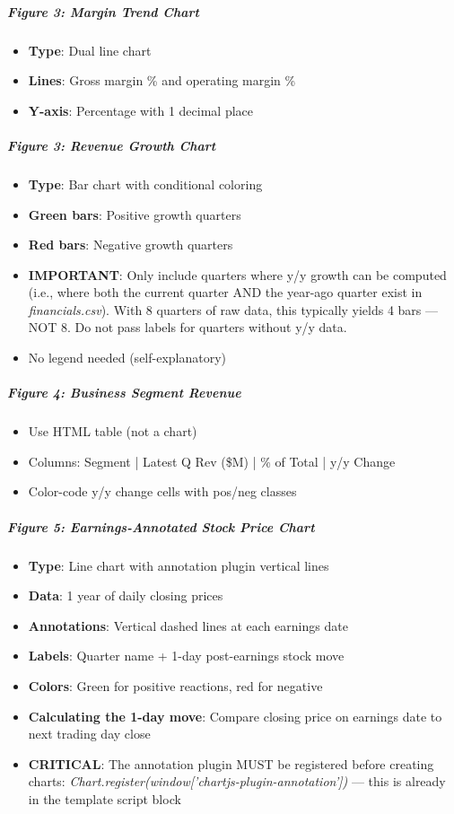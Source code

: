 \documentclass[11pt]{article}
\begin{document}
\subparagraph{Figure 3: Margin Trend Chart}\mbox{}\par
\begin{itemize}[leftmargin=*,itemsep=2pt,topsep=2pt]
\item {} \textbf{Type}: Dual line chart
\item {} \textbf{Lines}: Gross margin \% and operating margin \%
\item {} \textbf{Y-axis}: Percentage with 1 decimal place
\end{itemize}

\subparagraph{Figure 3: Revenue Growth Chart}\mbox{}\par
\begin{itemize}[leftmargin=*,itemsep=2pt,topsep=2pt]
\item {} \textbf{Type}: Bar chart with conditional coloring
\item {} \textbf{Green bars}: Positive growth quarters
\item {} \textbf{Red bars}: Negative growth quarters
\item {} \textbf{IMPORTANT}: Only include quarters where y/y growth can be computed (i.e., where both the current quarter AND the year-ago quarter exist in \emph{financials.csv}). With 8 quarters of raw data, this typically yields 4 bars — NOT 8. Do not pass labels for quarters without y/y data.
\item {} No legend needed (self-explanatory)
\end{itemize}

\subparagraph{Figure 4: Business Segment Revenue}\mbox{}\par
\begin{itemize}[leftmargin=*,itemsep=2pt,topsep=2pt]
\item {} Use HTML table (not a chart)
\item {} Columns: Segment | Latest Q Rev (\$M) | \% of Total | y/y Change
\item {} Color-code y/y change cells with pos/neg classes
\end{itemize}

\subparagraph{Figure 5: Earnings-Annotated Stock Price Chart}\mbox{}\par
\begin{itemize}[leftmargin=*,itemsep=2pt,topsep=2pt]
\item {} \textbf{Type}: Line chart with annotation plugin vertical lines
\item {} \textbf{Data}: 1 year of daily closing prices
\item {} \textbf{Annotations}: Vertical dashed lines at each earnings date
\item {} \textbf{Labels}: Quarter name + 1-day post-earnings stock move
\item {} \textbf{Colors}: Green for positive reactions, red for negative
\item {} \textbf{Calculating the 1-day move}: Compare closing price on earnings date to next trading day close
\item {} \textbf{CRITICAL}: The annotation plugin MUST be registered before creating charts: \emph{Chart.register(window['chartjs-plugin-annotation'])} — this is already in the template script block
\end{itemize}
\end{document}
